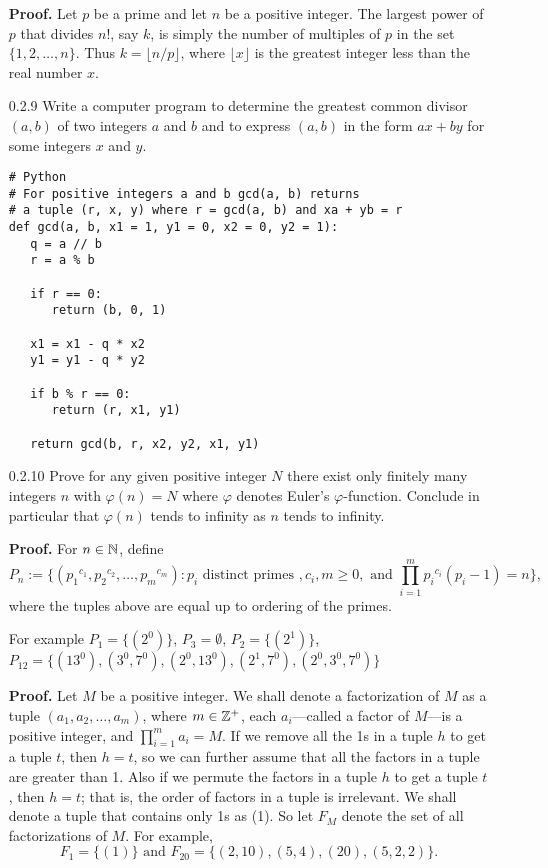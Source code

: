 \begin{enumerate}
      \textbf{Proof.} Let $p$ be a prime and let $n$ be a positive integer. The
      largest power of $p$ that divides $n!$, say $k$, is simply the number of 
      multiples of $p$ in the set $\{1, 2, \ldots, n\}$. Thus
      $k = \lfloor{n/p}\rfloor$, where $\lfloor{x}\rfloor$ is the greatest
      integer less than the real number $x$.
   \item[0.2.9]   Write a computer program to determine the greatest common
                  divisor $(a, b)$ of two integers $a$ and $b$ and to express
                  $(a, b)$ in the form $ax + by$ for some integers $x$ and $y$.

   \begin{verbatim}
# Python
# For positive integers a and b gcd(a, b) returns
# a tuple (r, x, y) where r = gcd(a, b) and xa + yb = r
def gcd(a, b, x1 = 1, y1 = 0, x2 = 0, y2 = 1):
   q = a // b
   r = a % b

   if r == 0:
      return (b, 0, 1)

   x1 = x1 - q * x2
   y1 = y1 - q * y2

   if b % r == 0:
      return (r, x1, y1)

   return gcd(b, r, x2, y2, x1, y1)
   \end{verbatim}
   \item[0.2.10]  Prove for any given positive integer $N$ there exist only
                  finitely many integers $n$ with $\varphi(n) = N$ where
                  $\varphi$ denotes Euler's $\varphi$-function. Conclude in 
                  particular that $\varphi(n)$ tends to infinity as $n$ tends to
                  infinity.

      \textbf{Proof.} For $n \in \mathbb{N}$, define
      $$ P_n := \{({p_1}^{c_1}, {p_2}^{c_2}, \ldots, {p_m}^{c_m}) :
         p_i \text{ distinct primes }, c_i, m \ge 0, \text{ and }
         \prod_{i=1}^m {p_i}^{c_i}(p_i-1) = n\},$$
      where the tuples above are equal up to ordering of the primes.

      For example $P_1 = \{(2^0)\}$, $P_3 = \emptyset$, $P_2 = \{(2^1)\}$, $P_{12} = \{(13^0),
      (3^0, 7^0), (2^0, 13^0), (2^1, 7^0), (2^0, 3^0, 7^0)\}$

      \textbf{Proof.} Let $M$ be a positive integer. We shall denote a 
      factorization of $M$ as a tuple $(a_1, a_2, \ldots, a_m)$, where
      $m \in \mathbb{Z}^+$, each $a_i$---called a factor of $M$---is a positive integer,
      and $\prod_{i=1}^m a_i = M$. If we remove all the 1s in a tuple $h$ to get
      a tuple $t$, then $h = t$, so we can further assume that all the factors 
      in a tuple are greater than 1. Also if we permute the factors in a tuple 
      $h$ to get a tuple $t$, then $h = t$; that is, the order of factors in a 
      tuple is irrelevant. We shall denote a tuple that contains only 1s as (1).
      So let $F_M$ denote the set of all factorizations of $M$. For example,
      $$F_1 = \{(1)\} \text{ and }
        F_{20} = \{(2, 10), (5, 4), (20), (5, 2, 2)\}.$$


\end{enumerate}
